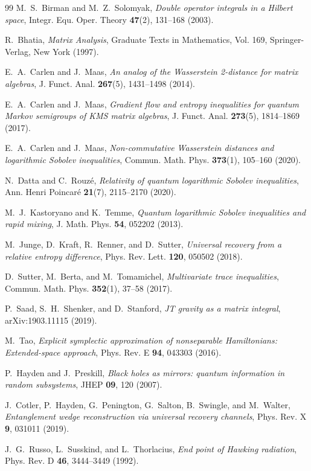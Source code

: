 \documentclass[11pt,a4paper]{article}
\theoremstyle{plain}
\theoremstyle{definition}
\begin{document}
\begin{thebibliography}{99}
M.~S.~Birman and M.~Z.~Solomyak, \textit{Double operator integrals in a Hilbert space}, Integr. Equ. Oper. Theory \textbf{47}(2), 131--168 (2003).

R.~Bhatia, \textit{Matrix Analysis}, Graduate Texts in Mathematics, Vol. 169, Springer-Verlag, New York (1997).

E.~A.~Carlen and J.~Maas, \textit{An analog of the Wasserstein 2-distance for matrix algebras}, J. Funct. Anal. \textbf{267}(5), 1431--1498 (2014).

E.~A.~Carlen and J.~Maas, \textit{Gradient flow and entropy inequalities for quantum Markov semigroups of KMS matrix algebras}, J. Funct. Anal. \textbf{273}(5), 1814--1869 (2017).

E.~A.~Carlen and J.~Maas, \textit{Non-commutative Wasserstein distances and logarithmic Sobolev inequalities}, Commun. Math. Phys. \textbf{373}(1), 105--160 (2020).

N.~Datta and C.~Rouz\'{e}, \textit{Relativity of quantum logarithmic Sobolev inequalities}, Ann. Henri Poincar\'{e} \textbf{21}(7), 2115--2170 (2020).

M.~J.~Kastoryano and K.~Temme, \textit{Quantum logarithmic Sobolev inequalities and rapid mixing}, J. Math. Phys. \textbf{54}, 052202 (2013).

M.~Junge, D.~Kraft, R.~Renner, and D.~Sutter, \textit{Universal recovery from a relative entropy difference}, Phys. Rev. Lett. \textbf{120}, 050502 (2018).

D.~Sutter, M.~Berta, and M.~Tomamichel, \textit{Multivariate trace inequalities}, Commun. Math. Phys. \textbf{352}(1), 37--58 (2017).

P.~Saad, S.~H.~Shenker, and D.~Stanford, \textit{JT gravity as a matrix integral}, arXiv:1903.11115 (2019).

M.~Tao, \textit{Explicit symplectic approximation of nonseparable Hamiltonians: Extended-space approach}, Phys. Rev. E \textbf{94}, 043303 (2016).

P.~Hayden and J.~Preskill, \textit{Black holes as mirrors: quantum information in random subsystems}, JHEP \textbf{09}, 120 (2007).

J.~Cotler, P.~Hayden, G.~Penington, G.~Salton, B.~Swingle, and M.~Walter, \textit{Entanglement wedge reconstruction via universal recovery channels}, Phys. Rev. X \textbf{9}, 031011 (2019).

J.~G.~Russo, L.~Susskind, and L.~Thorlacius, \textit{End point of Hawking radiation}, Phys. Rev. D \textbf{46}, 3444--3449 (1992).
\end{thebibliography}
\end{document}
